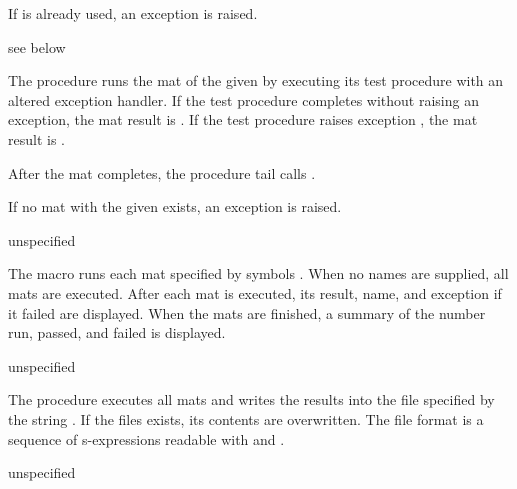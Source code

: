 \documentclass[letterpaper,11pt,twoside,final]{article}
\begin{document}
If  is already used, an exception is raised.

\begin{procedure}
\end{procedure}
\returns{} see below

The  procedure runs the mat of the given  by
executing its test procedure with an altered exception handler. If the
test procedure completes without raising an exception, the mat result
is . If the test procedure raises exception , the
mat result is .

After the mat completes, the  procedure tail calls
.

If no mat with the given  exists, an exception is raised.

\begin{syntax}
\end{syntax}
\begin{syntax}
\end{syntax}
\returns{} unspecified

The  macro runs each mat specified by symbols
  \etc.  When no names are supplied, all
mats are executed.  After each mat is executed, its result, name, and
exception if it failed are displayed.  When the mats are finished, a
summary of the number run, passed, and failed is displayed.

\begin{procedure}
\end{procedure}
\returns{} unspecified

The  procedure executes all mats and writes
the results into the file specified by the string . If
the files exists, its contents are overwritten. The file format is a
sequence of s-expressions readable with  and
.

\begin{procedure}
\end{procedure}
\returns{} unspecified
\end{document}
